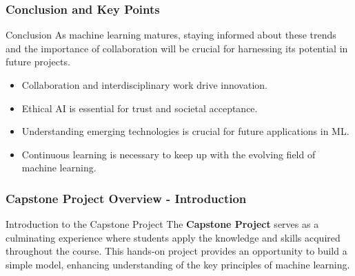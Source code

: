 \documentclass[aspectratio=169]{beamer}
\begin{document}
\begin{frame}[fragile]
    \frametitle{Conclusion and Key Points}
    \begin{block}{Conclusion}
        As machine learning matures, staying informed about these trends and the importance of collaboration will be crucial for harnessing its potential in future projects. 
    \end{block}
    
    \begin{itemize}
        \item Collaboration and interdisciplinary work drive innovation.
        \item Ethical AI is essential for trust and societal acceptance.
        \item Understanding emerging technologies is crucial for future applications in ML.
        \item Continuous learning is necessary to keep up with the evolving field of machine learning.
    \end{itemize}
\end{frame}

\begin{frame}[fragile]
  \frametitle{Capstone Project Overview - Introduction}
  
  \begin{block}{Introduction to the Capstone Project}
    The \textbf{Capstone Project} serves as a culminating experience where students apply 
    the knowledge and skills acquired throughout the course. This hands-on project provides 
    an opportunity to build a simple model, enhancing understanding of the key principles 
    of machine learning.
  \end{block}
\end{frame}
\end{document}
